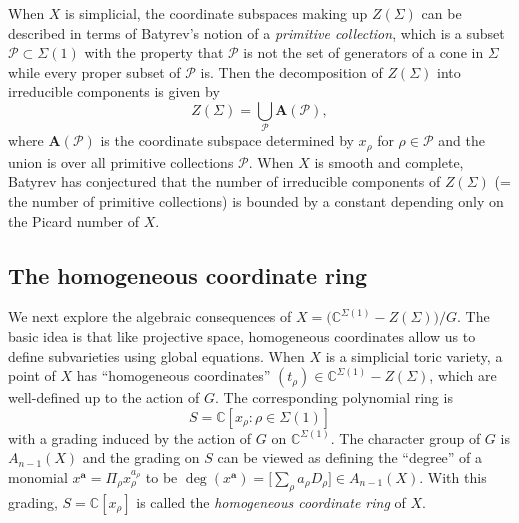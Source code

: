\documentclass{amsart}
\theoremstyle{plain}
\theoremstyle{definition}
\begin{document}
	When $X$ is simplicial, the coordinate subspaces making up
$Z(\Sigma)$ can be described in terms of Batyrev's notion of a {\it
primitive collection\/}, which is a subset $\mathcal{P} \subset \Sigma(1)$
with the property that $\mathcal{P}$ is not the set of generators of a
cone in $\Sigma$ while every proper subset of $\mathcal{P}$ is.  Then the
decomposition of $Z(\Sigma)$ into irreducible components is given by
\[
Z(\Sigma) = \bigcup_{\mathcal{P}} \mathbf{A}(\mathcal{P}),
\]
where $\mathbf{A}(\mathcal{P})$ is the coordinate subspace determined by
$x_\rho$ for $\rho \in \mathcal{P}$ and the union is over all primitive
collections $\mathcal{P}$.  When $X$ is smooth and complete, Batyrev has
conjectured \cite{Bat2} that the number of irreducible components of
$Z(\Sigma)$ (= the number of primitive collections) is bounded by a
constant depending only on the Picard number of $X$.

	\subsection{The homogeneous coordinate ring} We next
explore the algebraic consequen\-ces of $X = \big(\mathbb{C}^{\Sigma(1)}
-Z(\Sigma)\big)/G$.  The basic idea is that like projective space,
homogeneous coordinates allow us to define subvarieties using global
equations.  When $X$ is a simplicial toric variety, a point of $X$ has
``homogeneous coordinates'' $(t_\rho) \in \mathbb{C}^{\Sigma(1)}
-Z(\Sigma)$, which are well-defined up to the action of $G$.  The
corresponding polynomial ring is
\[
S = \mathbb{C}[x_\rho: \rho \in \Sigma(1)]
\]
with a grading induced by the action of $G$ on $\mathbb{C}^{\Sigma(1)}$.
The character group of $G$ is $A_{n-1}(X)$ and the grading on $S$ can
be viewed as defining the ``degree'' of a monomial $x^{\mathbf{a}} =
\Pi_\rho x_\rho^{a_\rho}$ to be $\deg(x^{\mathbf{a}}) = \big[\sum_\rho
a_\rho D_\rho\big] \in A_{n-1}(X)$.  With this grading, $S = \mathbb{C}[x_\rho]$ is called the {\it homogeneous coordinate ring\/} of $X$.
\end{document}

